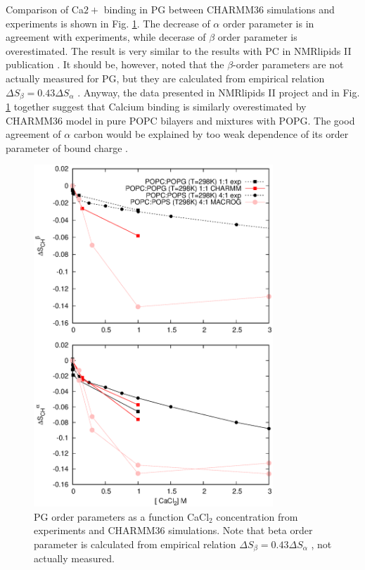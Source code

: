 \documentclass[aps,prl,superscriptaddress,twocolumn]{revtex4}
\begin{document}
Comparison of Ca$2+$ binding in PG between CHARMM36 simulations and experiments \cite{borle85}
is shown in Fig. \ref{changesWITHCaClPG}. The decrease of $\alpha$ order parameter
is in agreement with experiments, while decerase of $\beta$ order parameter is overestimated.
The result is very similar to the results with PC in NMRlipids II publication \cite{catte16}.
It should be, however, noted that the $\beta$-order parameters are not actually measured for PG,
but they are calculated from empirical relation $\Delta S_{\beta}=0.43\Delta S_{\alpha}$ \cite{akutsu81}.
Anyway, the data presented in NMRlipids II project and in Fig. \ref{changesWITHCaClPG} together
suggest that Calcium binding is similarly overestimated by CHARMM36 model in pure POPC bilayers and mixtures with
POPG. The good agreement of $\alpha$ carbon would be explained by too weak dependence of its order
parameter of bound charge .
\begin{figure}[]
  \centering
  \includegraphics[width=9.0cm]{../Figs/CHANGESwithCaClPGPS.eps}
  \caption{\label{changesWITHCaClPG}
    PG order parameters as a function CaCl$_2$ concentration from experiments \cite{borle85} and CHARMM36 simulations.
    Note that beta order parameter is calculated from empirical relation $\Delta S_{\beta}=0.43\Delta S_{\alpha}$ \cite{akutsu81}, not actually measured. 
  }
\end{figure}
\end{document}
